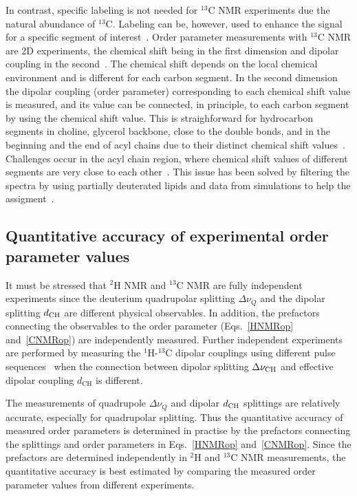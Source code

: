 \documentclass[aps,prl,superscriptaddress,twocolumn]{revtex4}
\begin{document}
In contrast, specific labeling is not needed for $^{13}$C NMR experiments due the 
natural abundance of $^{13}$C.  Labeling can be, however, used to enhance the signal for a specific 
segment of interest~\cite{sivanandam09}. Order parameter measurements with $^{13}$C NMR are
2D experiments, the chemical shift being in the first dimension and dipolar coupling 
in the second~\cite{hong95a,gross97,dvinskikh05a,ferreira13}. The chemical shift depends on the local chemical environment and is different for each carbon segment. In the second dimension the dipolar coupling
(order parameter) corresponding to each chemical shift value is measured, and its value 
can be connected, in principle, to each carbon segment by using the chemical shift value.  
This is straighforward for hydrocarbon segments in choline, glycerol backbone, close to the 
double bonds, and in the beginning and the end of acyl chains due to their distinct chemical 
shift values~\cite{hong95a,gross97,dvinskikh05a,ferreira13,leftin14}.
Challenges occur in the acyl chain region, where chemical shift values 
of different segments are very close to each other~\cite{hong95a,gross97,dvinskikh05a,ferreira13,leftin14}. 
This issue has been solved by filtering the spectra by using partially deuterated lipids
and data from simulations to help the assigment~\cite{ferreira13,leftin14}. 


\subsection{Quantitative accuracy of experimental order parameter values}\label{QUANTaccuracySECTION}

It must be stressed that $^2$H NMR and $^{13}$C NMR are fully independent experiments since the deuterium quadrupolar splitting $\Delta \nu_Q$
and the dipolar splitting $d_{{\rm CH}}$ are different physical observables. In addition, the prefactors connecting the observables to the order 
parameter (Eqs.~\ref{HNMRop} and~\ref{CNMRop}) are independently measured. Further independent experiments are performed 
by measuring the $^1$H-$^{13}$C dipolar couplings using different pulse sequences~\cite{hong95a,gross97,dvinskikh05a,ferreira13} 
when the connection between dipolar splitting $\Delta \nu_{{\rm CH}}$ and effective dipolar coupling $d_\mathrm{CH}$ is different.

The measurements of quadrupole $\Delta \nu_Q$ and dipolar $d_{{\rm CH}}$ splittings are relatively accurate, especially for quadrupolar splitting.
Thus the quantitative accuracy of measured order parameters is determined in practise by the  
prefactors connecting the splittings and order parameters in Eqs.~\ref{HNMRop} and~\ref{CNMRop}. 
Since the prefactors are determined independently in $^2$H and $^{13}$C NMR measurements,
the quantitative accuracy is best estimated by comparing the measured order parameter values
from different experiments.
\end{document}
